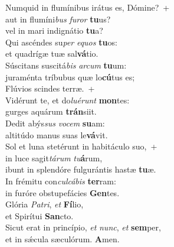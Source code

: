 \evenverse Numquid in flumínibus irátus es, Dómine?~+\\\evenverse  aut in flumíni\textit{bus} \textit{fu}\textit{ror} \textbf{tu}us?~\*\\
\evenverse vel in mari indignátio \textbf{tu}a?\\
\oddverse Qui ascéndes su\textit{per} \textit{e}\textit{quos} \textbf{tu}os:~\*\\
\oddverse et quadrígæ tuæ sal\textbf{vá}tio.\\
\evenverse Súscitans suscitá\textit{bis} \textit{ar}\textit{cum} \textbf{tu}um:~\*\\
\evenverse juraménta tríbubus quæ lo\textbf{cú}tus es;\\
\oddverse Flúvios scindes terræ.~+\\
\oddverse  Vidérunt te, et do\textit{lu}\textit{é}\textit{runt} \textbf{mon}tes:~\*\\
\oddverse gurges aquárum \textbf{trán}siit.\\
\evenverse Dedit abýs\textit{sus} \textit{vo}\textit{cem} \textbf{su}am:~\*\\
\evenverse altitúdo manus suas le\textbf{vá}vit.\\
\oddverse Sol et luna stetérunt in habitáculo suo,~+\\
\oddverse  in luce sagit\textit{tá}\textit{rum} \textit{tu}\textbf{á}rum,~\*\\
\oddverse ibunt in splendóre fulgurántis hastæ \textbf{tu}æ.\\
\evenverse In frémitu con\textit{cul}\textit{cá}\textit{bis} \textbf{ter}ram:~\*\\
\evenverse in furóre obstupefácies \textbf{Gen}tes.\\
\oddverse Glória \textit{Pa}\textit{tri}, \textit{et} \textbf{Fí}lio,~\*\\
\oddverse et Spirítui \textbf{San}cto.\\
\evenverse Sicut erat in princípio, \textit{et} \textit{nunc}, \textit{et} \textbf{sem}per,~\*\\
\evenverse et in sǽcula sæculórum. \textbf{A}men.\\
